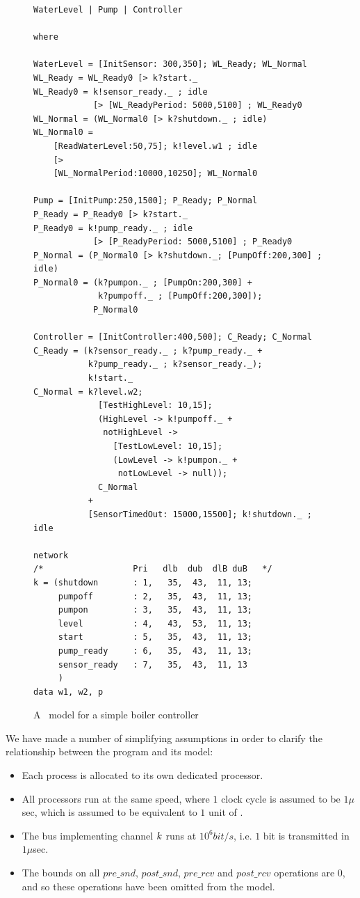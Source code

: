 \begin{figure}
\begin{center}
\begin{minipage}{.6\linewidth}
\scriptsize
\begin{verbatim}
WaterLevel | Pump | Controller 

where

WaterLevel = [InitSensor: 300,350]; WL_Ready; WL_Normal
WL_Ready = WL_Ready0 [> k?start._
WL_Ready0 = k!sensor_ready._ ; idle 
            [> [WL_ReadyPeriod: 5000,5100] ; WL_Ready0
WL_Normal = (WL_Normal0 [> k?shutdown._ ; idle)
WL_Normal0 =
    [ReadWaterLevel:50,75]; k!level.w1 ; idle
    [>
    [WL_NormalPeriod:10000,10250]; WL_Normal0

Pump = [InitPump:250,1500]; P_Ready; P_Normal
P_Ready = P_Ready0 [> k?start._
P_Ready0 = k!pump_ready._ ; idle 
            [> [P_ReadyPeriod: 5000,5100] ; P_Ready0
P_Normal = (P_Normal0 [> k?shutdown._; [PumpOff:200,300] ; idle)
P_Normal0 = (k?pumpon._ ; [PumpOn:200,300] + 
             k?pumpoff._ ; [PumpOff:200,300]); 
            P_Normal0

Controller = [InitController:400,500]; C_Ready; C_Normal
C_Ready = (k?sensor_ready._ ; k?pump_ready._ + 
           k?pump_ready._ ; k?sensor_ready._);
           k!start._ 
C_Normal = k?level.w2;  
             [TestHighLevel: 10,15];
             (HighLevel -> k!pumpoff._ +
              notHighLevel -> 
                [TestLowLevel: 10,15];
                (LowLevel -> k!pumpon._ +
                 notLowLevel -> null));
             C_Normal 
           + 
           [SensorTimedOut: 15000,15500]; k!shutdown._ ; idle
    
network 
/*                  Pri   dlb  dub  dlB duB   */
k = (shutdown       : 1,   35,  43,  11, 13;
     pumpoff        : 2,   35,  43,  11, 13;
     pumpon         : 3,   35,  43,  11, 13;
     level          : 4,   43,  53,  11, 13;
     start          : 5,   35,  43,  11, 13;
     pump_ready     : 6,   35,  43,  11, 13;
     sensor_ready   : 7,   35,  43,  11, 13
     )
data w1, w2, p
\end{verbatim}
\end{minipage}
\end{center}
\caption{A \bcandle\ model for a simple boiler controller\label{fig:prbcboiler}}
\end{figure} 

We have made a number of simplifying assumptions in order to 
clarify the relationship between the program and its model:
\begin{itemize}
\item Each process is allocated to its own dedicated processor.
\item All processors run at the same speed, where $1$ clock cycle is
   assumed to be $1\mu$sec, which is assumed to be equivalent to $1$ unit of 
   .
\item The bus implementing channel ${k}$ runs at $10^6 bit/s$, i.e.
  $1$ bit is transmitted in $1\mu$sec.
\item The bounds on all $pre\_snd$, $post\_snd$, $pre\_rcv$ and $post\_rcv$
  operations are $0$, and so these operations have been omitted from the 
  model.  
\end{itemize} 

